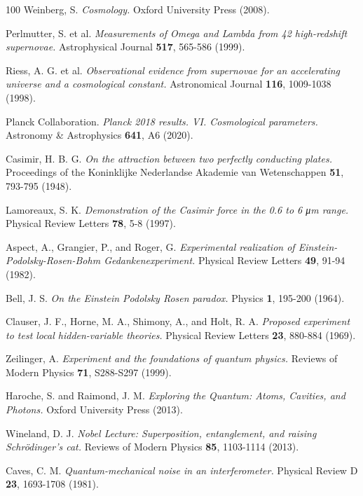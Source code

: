 \documentclass[11pt]{article}
\theoremstyle{definition}
\begin{document}
\begin{thebibliography}{100}
Weinberg, S.
\textit{Cosmology.}
Oxford University Press (2008).

Perlmutter, S. et al.
\textit{Measurements of Omega and Lambda from 42 high-redshift supernovae.}
Astrophysical Journal \textbf{517}, 565-586 (1999).

Riess, A. G. et al.
\textit{Observational evidence from supernovae for an accelerating universe and a cosmological constant.}
Astronomical Journal \textbf{116}, 1009-1038 (1998).

Planck Collaboration.
\textit{Planck 2018 results. VI. Cosmological parameters.}
Astronomy \& Astrophysics \textbf{641}, A6 (2020).

Casimir, H. B. G.
\textit{On the attraction between two perfectly conducting plates.}
Proceedings of the Koninklijke Nederlandse Akademie van Wetenschappen \textbf{51}, 793-795 (1948).

Lamoreaux, S. K.
\textit{Demonstration of the Casimir force in the 0.6 to 6 μm range.}
Physical Review Letters \textbf{78}, 5-8 (1997).

Aspect, A., Grangier, P., and Roger, G.
\textit{Experimental realization of Einstein-Podolsky-Rosen-Bohm Gedankenexperiment.}
Physical Review Letters \textbf{49}, 91-94 (1982).

Bell, J. S.
\textit{On the Einstein Podolsky Rosen paradox.}
Physics \textbf{1}, 195-200 (1964).

Clauser, J. F., Horne, M. A., Shimony, A., and Holt, R. A.
\textit{Proposed experiment to test local hidden-variable theories.}
Physical Review Letters \textbf{23}, 880-884 (1969).

Zeilinger, A.
\textit{Experiment and the foundations of quantum physics.}
Reviews of Modern Physics \textbf{71}, S288-S297 (1999).

Haroche, S. and Raimond, J. M.
\textit{Exploring the Quantum: Atoms, Cavities, and Photons.}
Oxford University Press (2013).

Wineland, D. J.
\textit{Nobel Lecture: Superposition, entanglement, and raising Schrödinger's cat.}
Reviews of Modern Physics \textbf{85}, 1103-1114 (2013).

Caves, C. M.
\textit{Quantum-mechanical noise in an interferometer.}
Physical Review D \textbf{23}, 1693-1708 (1981).


\end{thebibliography}
\end{document}
